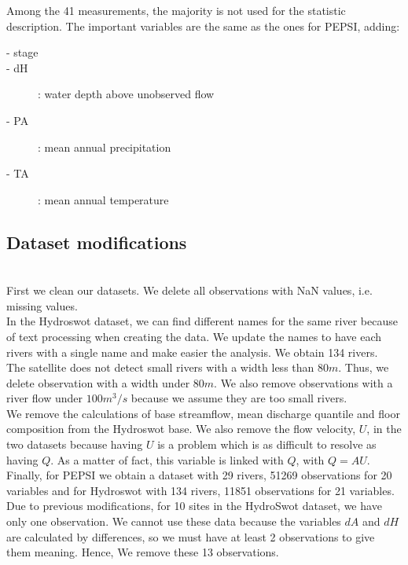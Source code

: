 Among the 41 measurements, the majority is not used for the statistic description. The important variables are the same as the ones for PEPSI, adding:

\begin{description}
    \item [- stage]
    \item [- dH]: water depth above unobserved flow
    \item[- PA]: mean annual precipitation
    \item[- TA]: mean annual temperature
\end{description}


\subsection{Dataset modifications}\\
First we clean our datasets. We delete all observations with NaN values, i.e. missing values.\\

In the Hydroswot dataset, we can find different names for the same river because of text processing when creating the data. We update the names to have each rivers with a single name and make easier the analysis. We obtain 134 rivers.  \\

The satellite does not detect small rivers with a width less than $80m$. Thus, we delete observation with a width under $80m$. We also remove observations with a river flow under $100 m^3/s$ because we assume they are too small rivers.\\

We remove the calculations of base streamflow, mean discharge quantile and floor composition from the Hydroswot base. We also remove the flow velocity, $U$, in the two datasets because having $U$ is a problem which is as difficult to resolve as having $Q$. As a matter of fact, this variable is linked with $Q$, with $Q = AU$.   \\

Finally, for PEPSI we obtain a dataset with 29 rivers, 51269 observations for 20 variables and for Hydroswot with 134 rivers, 11851 observations for 21 variables. \\
        
Due to previous modifications, for 10 sites in the HydroSwot dataset, we have only one observation. We cannot use these data because the variables $dA$ and $dH$ are calculated by differences, so we must have at least 2 observations to give them meaning. Hence, We remove these 13 observations. \\

